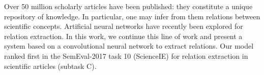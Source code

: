 Over 50 million scholarly articles have been published: they constitute a unique repository of knowledge. In particular, one may infer from them relations between scientific concepts. Artificial neural networks have recently been explored for relation extraction. In this work, we continue this line of work and present a system based on a convolutional neural network to extract relations. Our model ranked first in the SemEval-2017 task 10 (ScienceIE) for relation extraction in scientific articles (subtask C).
